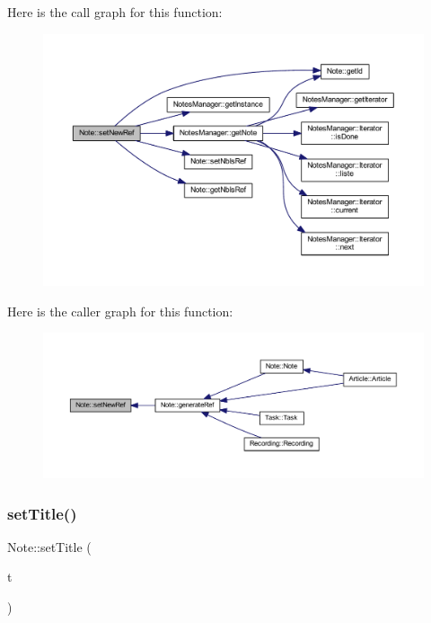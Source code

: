 Here is the call graph for this function\+:\nopagebreak
\begin{figure}[H]
\begin{center}
\leavevmode
\includegraphics[width=350pt]{class_note_a3af2edc369310b9f122bd1fd6dbfa717_cgraph}
\end{center}
\end{figure}
Here is the caller graph for this function\+:\nopagebreak
\begin{figure}[H]
\begin{center}
\leavevmode
\includegraphics[width=350pt]{class_note_a3af2edc369310b9f122bd1fd6dbfa717_icgraph}
\end{center}
\end{figure}
\mbox{\label{class_note_ab1a8b5e69f3f23ed460f4761c9d4863d}} 
\subsubsection{\texorpdfstring{set\+Title()}{setTitle()}}
{\footnotesize\ttfamily Note\+::set\+Title (\begin{DoxyParamCaption}\item[{const Q\+String \&}]{t }\end{DoxyParamCaption})\hspace{0.3cm}{\ttfamily [inline]}}



